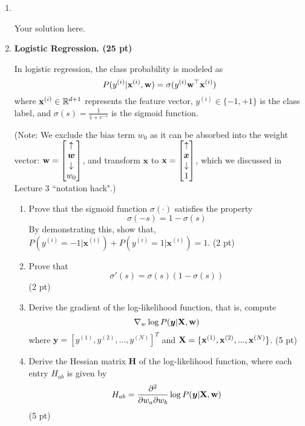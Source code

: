 \documentclass{article}
\theoremstyle{definition}
\theoremstyle{remark}
\newenvironment{Q}
        {%
          \clearpage
          \item
        }
        {%
          \phantom{s} %
          \bigskip
        }
\begin{document}
\begin{enumerate}[font={\Large\bfseries},left=0pt]
\begin{Q}
\begin{enumerate}
\end{enumerate}



\end{Q}
\begin{tcolorbox}
    Your solution here.
\end{tcolorbox}
\begin{Q}
\textbf{\Large Logistic Regression. (25 pt)}

In logistic regression, the class probability is modeled as 
    $$P(y^{(i)}|{\bf{x}}^{(i)}, {\bf{w}}) = \sigma(y^{(i)} {\bf{w}}^\top {\bf{x}}^{(i)})$$ 
    where ${\bf{x}}^{(i)} \in \mathbb{R}^{d+1}$ represents the feature vector, $y^{(i)} \in \{-1,+1\}$ is the class label, and $\sigma(s) = \frac{1}{1 + e^{-s}}$ is the sigmoid function.

    (Note: We exclude the bias term $w_0$ as it can be absorbed into the weight vector: ${\bf w}=\begin{bmatrix}\uparrow \\\bm w\\\downarrow \\ w_0\end{bmatrix}$, and transform $\bm x$ to ${\bf x}=\begin{bmatrix}\uparrow \\\bm x\\\downarrow \\ 1\end{bmatrix}$, which we discussed in Lecture 3 ``notation hack".)


    \begin{enumerate}
        \item Prove that the sigmoid function $\sigma(\cdot)$ satisfies the property 
        $$\sigma(-s) = 1 - \sigma(s)$$ 
        By demonstrating this, show that, $P(y^{(i)} = -1 | \bm{x}^{(i)}) + P(y^{(i)} = 1 | \bm{x}^{(i)}) = 1$. (2 pt)
        
        \item Prove that 
        $$\sigma'(s) = \sigma(s)(1 - \sigma(s))$$  (2 pt)

        \item Derive the gradient of the log-likelihood function, that is, compute 
        $$\nabla_w \log P(\bm{y} | {\bf{X}}, \bf{w})$$ 
        where $\bm{y} = [y^{(1)}, y^{(2)}, ..., y^{(N)}]^T$ and ${\bf{X}} = \{{\bf{x}}^{(1)}, {\bf{x}}^{(2)}, ..., {\bf{x}}^{(N)}\}$. (5 pt)

        \item Derive the Hessian matrix $\bm{H}$ of the log-likelihood function, where each entry $H_{ab}$ is given by
        $$H_{ab} = \frac{\partial^2}{\partial w_a \partial w_b} \log P(\bm{y} | {\bf{X}}, \bf{w})$$  (5 pt)


\end{enumerate}
\end{Q}
\end{enumerate}
\end{document}
